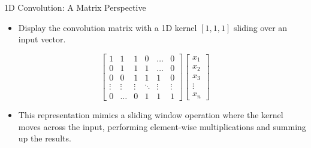 \documentclass[serif, aspectratio=169]{beamer}
\begin{document}
\begin{frame}{1D Convolution: A Matrix Perspective}
\small
\begin{itemize}
    \item Display the convolution matrix with a 1D kernel \([1, 1, 1]\) sliding over an input vector.
\end{itemize}

\vspace{0.3cm}

\[
\begin{bmatrix}
    1 & 1 & 1 & 0 & \dots & 0 \\
    0 & 1 & 1 & 1 & \dots & 0 \\
    0 & 0 & 1 & 1 & 1 & 0 \\
    \vdots & \vdots & \vdots & \ddots & \vdots & \vdots \\
    0 & \dots & 0 & 1 & 1 & 1
\end{bmatrix}
\begin{bmatrix}
    x_1 \\
    x_2 \\
    x_3 \\
    \vdots \\
    x_n
\end{bmatrix}
\]

\vspace{0.5cm}

\begin{itemize}
    \item This representation mimics a sliding window operation where the kernel moves across the input, performing element-wise multiplications and summing up the results.
\end{itemize}

\end{frame}
\end{document}
